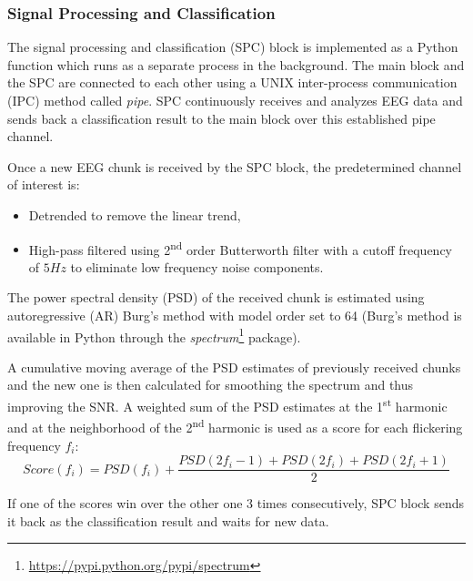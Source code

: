 \documentclass[12pt]{article}
\newcommand\mysubsubsection[1]{\subsubsection{#1}}
\numberwithin{equation}{section}
\numberwithin{figure}{section}
\numberwithin{table}{section}
\begin{document}
\mysubsubsection{Signal Processing and Classification}
\par{
    The signal processing and classification (SPC) block is implemented
    as a Python function which runs as a separate process in the background.
    The main block and the SPC are connected to each other using a UNIX inter-process
    communication (IPC) method called \emph{pipe}.
    SPC continuously receives and analyzes EEG data and sends back a classification
    result to the main block over this established pipe channel.
}
\par{
    Once a new EEG chunk is received by the SPC block, the predetermined channel of interest is:
    \begin{itemize}
        \item Detrended to remove the linear trend,
        \item High-pass filtered using 2\textsuperscript{nd} order Butterworth filter with a cutoff frequency of $5Hz$ to eliminate low frequency noise components.
    \end{itemize}
    The power spectral density (PSD) of the received chunk is estimated using autoregressive (AR) Burg's method \citep{kay_spectrum_1981} with model order set to 64
    (Burg's method is available in Python through the \emph{spectrum}\footnote{\url{https://pypi.python.org/pypi/spectrum}} package).
}
\par{
    A cumulative moving average of the PSD estimates of previously received chunks and the new one is then calculated for smoothing the spectrum and thus improving
    the SNR. A weighted sum of the PSD estimates at the 1\textsuperscript{st} harmonic and at the neighborhood of the 2\textsuperscript{nd} harmonic is used as a score for each flickering frequency $f_i$:
    $$Score(f_i)=PSD(f_i) + \frac{PSD(2f_i-1)+PSD(2f_i)+PSD(2f_i+1)}{2}$$
}
\par{
    If one of the scores win over the other one 3 times consecutively, SPC block sends it back as the
    classification result and waits for new data.
}
\end{document}
